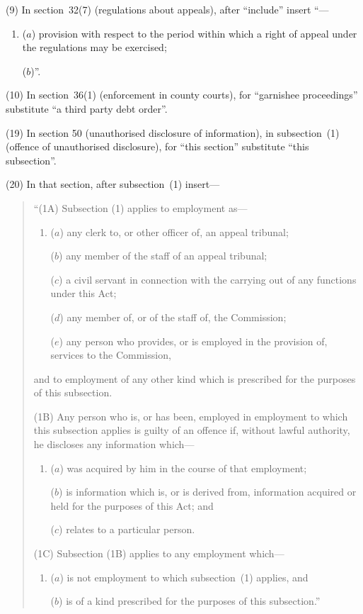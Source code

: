 \documentclass[12pt,a4paper]{article}
\begin{document}
(9) In section~32(7) (regulations about appeals), after “include” insert “—
\begin{enumerate}\item[]
 ($a$) provision with respect to the period within which a right of appeal under the regulations may be exercised;

($b$)”.
\end{enumerate}

(10) In section~36(1) (enforcement in county courts), for “garnishee proceedings” substitute “a third party debt order”.

(19) In section 50 (unauthorised disclosure of information), in subsection~(1) (offence of unauthorised disclosure), for “this section” substitute “this subsection”.

(20) In that section, after subsection~(1) insert—
\begin{quotation}
“(1A) Subsection (1) applies to employment as—
\begin{enumerate}\item[]
($a$) any clerk to, or other officer of, an appeal tribunal;

($b$) any member of the staff of an appeal tribunal;

($c$) a civil servant in connection with the carrying out of any functions under this Act;

($d$) any member of, or of the staff of, the Commission;

($e$) any person who provides, or is employed in the provision of, services to the Commission,
\end{enumerate}
and to employment of any other kind which is prescribed for the purposes of this subsection.

(1B) Any person who is, or has been, employed in employment to which this subsection applies is guilty of an offence if, without lawful authority, he discloses any information which—
\begin{enumerate}\item[]
($a$) was acquired by him in the course of that employment;

($b$) is information which is, or is derived from, information acquired or held for the purposes of this Act; and

($c$) relates to a particular person.
\end{enumerate}

(1C) Subsection (1B) applies to any employment which—
\begin{enumerate}\item[]
($a$) is not employment to which subsection~(1) applies, and

($b$) is of a kind prescribed for the purposes of this subsection.”
\end{enumerate}
\end{quotation}
\end{document}

